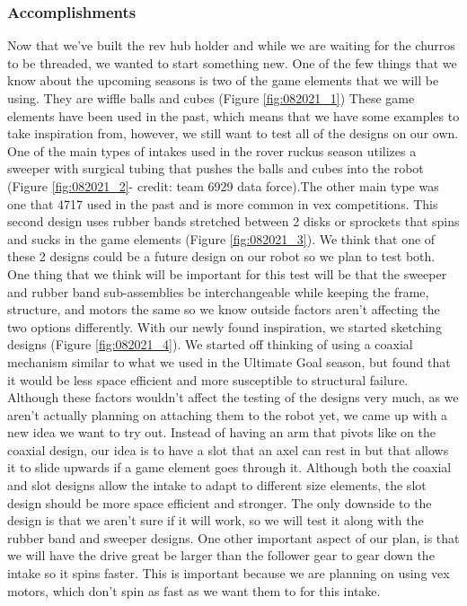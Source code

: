 \subsubsection*{Accomplishments}
Now that we’ve built the rev hub holder and while we are waiting for the churros to be threaded, we wanted to start something new. One of the few things that we know about the upcoming seasons is two of the game elements that we will be using. They are wiffle balls and cubes (Figure \ref{fig:082021_1}) These game elements have been used in the past, which means that we have some examples to take inspiration from, however, we still want to test all of the designs on our own. One of the main types of intakes used in the rover ruckus season utilizes a sweeper with surgical tubing that pushes the balls and cubes into the robot (Figure \ref{fig:082021_2}- credit: team 6929 data force).The other main type was one that 4717 used in the past and is more common in vex competitions. This second design uses rubber bands stretched between 2 disks or sprockets that spins and sucks in the game elements (Figure \ref{fig:082021_3}). We think that one of these 2 designs could be a future design on our robot so we plan to test both. One thing that we think will be important for this test will be that the sweeper and rubber band sub-assemblies be interchangeable while keeping the frame, structure, and motors the same so we know outside factors aren’t affecting the two options differently.
With our newly found inspiration, we started sketching designs (Figure \ref{fig:082021_4}). We started off thinking of using a coaxial mechanism similar to what we used in the Ultimate Goal season, but found that it would be less space efficient and more susceptible to structural failure. Although these factors wouldn’t affect the testing of the designs very much, as we aren't actually planning on attaching them to the robot yet, we came up with a new idea we want to try out. Instead of having an arm that pivots like on the coaxial design, our idea is to have a slot that an axel can rest in but that allows it to slide upwards if a game element goes through it. Although both the coaxial and slot designs allow the intake to adapt to different size elements, the slot design should be more space efficient and stronger. The only downside to the design is that we aren't sure if it will work, so we will test it along with the rubber band and sweeper designs. One other important aspect of our plan, is that we will have the drive great be larger than the follower gear to gear down the intake so it spins faster. This is important because we are planning on using vex motors, which don’t spin as fast as we want them to for this intake.
